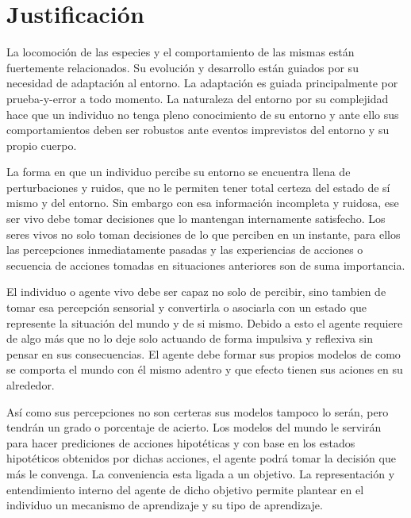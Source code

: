 \chapter{Justificaci\'on}
\label{chp:just}

La locomoci\'on de las especies y el comportamiento de las mismas est\'an fuertemente relacionados. Su evoluci\'on y desarrollo est\'an guiados por su necesidad de adaptaci\'on al entorno. La adaptaci\'on es guiada principalmente por prueba-y-error a todo momento. La naturaleza del entorno por su complejidad hace que un individuo no tenga pleno conocimiento de su entorno y ante ello sus comportamientos deben ser robustos ante eventos imprevistos del entorno y su propio cuerpo.

La forma en que un individuo percibe su entorno se encuentra llena de perturbaciones y ruidos, que no le permiten tener total certeza del estado de s\'i mismo y del entorno. Sin embargo con esa informaci\'on incompleta y ruidosa, ese ser vivo debe tomar decisiones que lo mantengan internamente satisfecho. Los seres vivos no solo toman decisiones de lo que perciben en un instante, para ellos las percepciones inmediatamente pasadas y las experiencias de acciones o secuencia de acciones tomadas en situaciones anteriores son de suma importancia.

El individuo o agente vivo debe ser capaz no solo de percibir, sino tambien de tomar esa percepci\'on sensorial y convertirla o asociarla con un estado que represente la situaci\'on del mundo y de si mismo. Debido a esto el agente requiere de algo m\'as que no lo deje solo actuando de forma impulsiva y reflexiva sin pensar en sus consecuencias. El agente debe formar sus propios modelos de como se comporta el mundo con \'el mismo adentro y que efecto tienen sus aciones en su alrededor.

As\'i como sus percepciones no son certeras sus modelos tampoco lo ser\'an, pero tendr\'an un grado o porcentaje de acierto. Los modelos del mundo le servir\'an para hacer prediciones de acciones hipot\'eticas y con base en los estados hipot\'eticos obtenidos por dichas acciones, el agente podr\'a tomar la decisi\'on que m\'as le convenga. La conveniencia esta ligada a un objetivo. La representaci\'on y entendimiento interno del agente de dicho objetivo permite plantear en el individuo un mecanismo de aprendizaje y su tipo de aprendizaje.

